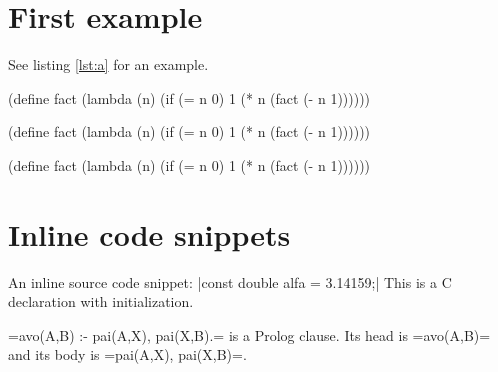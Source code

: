 \documentclass[10pt]{article}
\begin{document}
\section{First example}

See listing \ref{lst:a} for an example.

\begin{Example}
\begin{pygmented}[boxing method=mdframed,
  lang=scheme,
  linenos,
  firstline=10001,
  numbersep=2cm,
  backgroundcolor=red!16,
  label=lst:a,
  caption=A \textsl{Scheme} program.,
  ]
(define fact
    (lambda (n)
        (if (= n 0)
            1
            (* n (fact (- n 1))))))
\end{pygmented}
\end{Example}

\begin{Example}
\begin{pygmented}[boxing method=tcolorbox,
  lang=scheme,
  linenos,
  firstline=10001,
  numbersep=2cm,
  colback=green!16,
  label=lst:b,
  caption=A \textsl{Scheme} program.,
  ]
(define fact
    (lambda (n)
        (if (= n 0)
            1
            (* n (fact (- n 1))))))
\end{pygmented}
\end{Example}

\begin{Example}
\begin{pygmented}[boxing method=boite,
  lang=scheme,
  linenos,
  firstline=10001,
  numbersep=2cm,
  colback=yellow!16,
  label=lst:c,
  caption=A \textsl{Scheme} program.,
  ]
(define fact
    (lambda (n)
        (if (= n 0)
            1
            (* n (fact (- n 1))))))
\end{pygmented}
\end{Example}


\section{Inline code snippets}

An inline source code snippet:
\pyginline[lang=c]|const double alfa = 3.14159;|
This is a C declaration with initialization.

\pyginline[lang=prolog,backgroundcolor=yellow]=avo(A,B) :- pai(A,X), pai(X,B).=
is a Prolog clause. Its head is
\pyginline[lang=prolog,style=emacs,backgroundcolor=yellow,linecolor=red]=avo(A,B)=
and its body is
\pyginline[lang=prolog,style=vim,backgroundcolor=black,hidealllines]=pai(A,X), pai(X,B)=.
\end{document}
